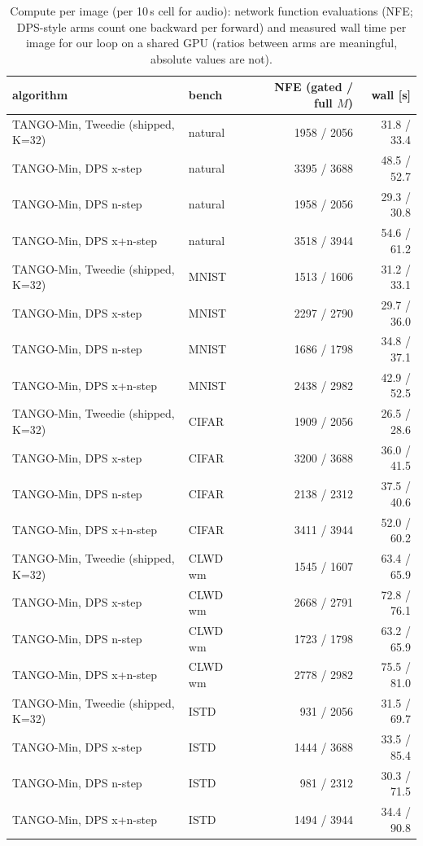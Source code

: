 \begin{table}[t]
\centering\small
\caption{Compute per image (per 10\,s cell for audio): network function evaluations (NFE; DPS-style arms count one backward per forward) and measured wall time per image for our loop on a shared GPU (ratios between arms are meaningful, absolute values are not).}
\label{tab:compute}
\begin{tabular}{llrr}
\toprule
algorithm & bench & NFE (gated / full $M$) & wall [s] \\
\midrule
TANGO-Min, Tweedie (shipped, K=32) & natural & 1958 / 2056 & 31.8 / 33.4 \\
TANGO-Min, DPS x-step & natural & 3395 / 3688 & 48.5 / 52.7 \\
TANGO-Min, DPS n-step & natural & 1958 / 2056 & 29.3 / 30.8 \\
TANGO-Min, DPS x+n-step & natural & 3518 / 3944 & 54.6 / 61.2 \\
TANGO-Min, Tweedie (shipped, K=32) & MNIST & 1513 / 1606 & 31.2 / 33.1 \\
TANGO-Min, DPS x-step & MNIST & 2297 / 2790 & 29.7 / 36.0 \\
TANGO-Min, DPS n-step & MNIST & 1686 / 1798 & 34.8 / 37.1 \\
TANGO-Min, DPS x+n-step & MNIST & 2438 / 2982 & 42.9 / 52.5 \\
TANGO-Min, Tweedie (shipped, K=32) & CIFAR & 1909 / 2056 & 26.5 / 28.6 \\
TANGO-Min, DPS x-step & CIFAR & 3200 / 3688 & 36.0 / 41.5 \\
TANGO-Min, DPS n-step & CIFAR & 2138 / 2312 & 37.5 / 40.6 \\
TANGO-Min, DPS x+n-step & CIFAR & 3411 / 3944 & 52.0 / 60.2 \\
TANGO-Min, Tweedie (shipped, K=32) & CLWD wm & 1545 / 1607 & 63.4 / 65.9 \\
TANGO-Min, DPS x-step & CLWD wm & 2668 / 2791 & 72.8 / 76.1 \\
TANGO-Min, DPS n-step & CLWD wm & 1723 / 1798 & 63.2 / 65.9 \\
TANGO-Min, DPS x+n-step & CLWD wm & 2778 / 2982 & 75.5 / 81.0 \\
TANGO-Min, Tweedie (shipped, K=32) & ISTD & 931 / 2056 & 31.5 / 69.7 \\
TANGO-Min, DPS x-step & ISTD & 1444 / 3688 & 33.5 / 85.4 \\
TANGO-Min, DPS n-step & ISTD & 981 / 2312 & 30.3 / 71.5 \\
TANGO-Min, DPS x+n-step & ISTD & 1494 / 3944 & 34.4 / 90.8 \\

\end{tabular}
\end{table}
